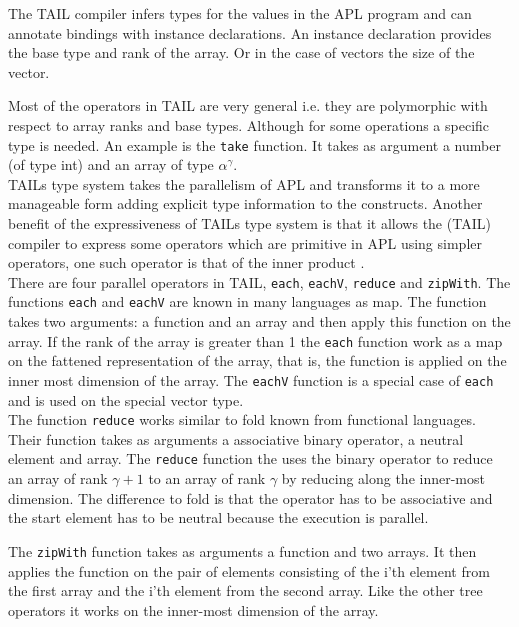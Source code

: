 \documentclass[11pt]{article}
\begin{document}
The TAIL compiler infers types for the values in the APL program and can annotate bindings with
instance declarations. An instance declaration provides the base type and rank of the array. Or in
the case of vectors the size of the vector.

Most of the operators in TAIL are very general i.e. they are polymorphic with respect to array ranks and base types.
Although for some operations a specific type is needed.
An example is the {\tt take} function. It takes as argument a number (of type int) and an array of type $\alpha^\gamma$.\\

 TAILs type system takes the parallelism of APL and transforms it to a more manageable form adding explicit type
 information to the constructs.
Another benefit of the expressiveness of TAILs type system is that it allows the (TAIL) compiler to express some operators which
are primitive in APL using simpler operators, one such operator is that of the inner product \cite{ElsmanDybdal:Array:2014}. \\

There are four parallel operators in TAIL, {\tt each}, {\tt eachV}, {\tt reduce} and {\tt zipWith}.
The functions {\tt each} and {\tt eachV} are known in many languages as map.
The function takes two arguments: a function and an array and then apply this function on the array.
If the rank of the array is greater than 1 the {\tt each} function work as a map on the fattened representation of the array,
that is, the function is applied on the inner most dimension of the array.
The {\tt eachV} function is a special case of {\tt each} and is used on the special vector type.\\

The function {\tt reduce} works similar to fold known from functional languages.
Their function takes as arguments a associative binary operator, a neutral element and array.
The {\tt reduce} function the uses the binary operator 
to reduce an array of rank $\gamma+1$ to an array of rank $\gamma$ by reducing along the inner-most dimension.
The difference to fold is that the operator has to be associative and the start element has to be neutral
because the execution is parallel.

The {\tt zipWith} function takes as arguments a function and two arrays.
It then applies the function on the pair of elements consisting of the i'th element
from the first array and the i'th element from the second array.
Like the other tree operators it works on the inner-most dimension of the array\cite{ElsmanDybdal:Array:2014}.
\end{document}

